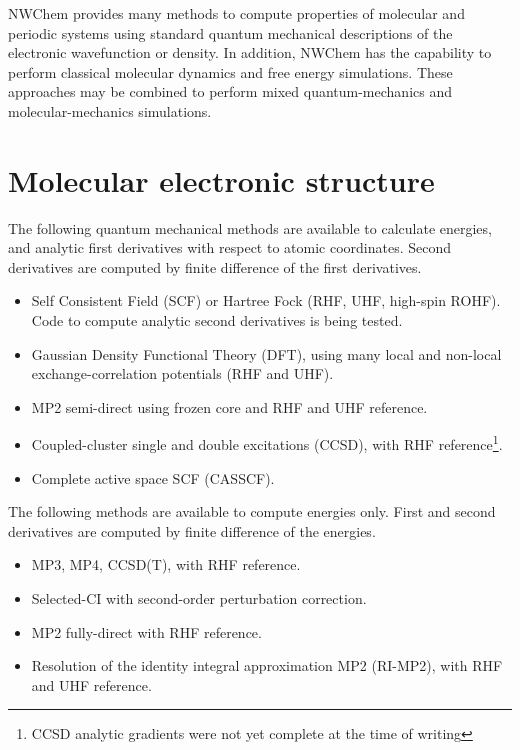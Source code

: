 \label{sec:functionality}

NWChem provides many methods to compute properties of molecular and
periodic systems using standard quantum mechanical descriptions of the
electronic wavefunction or density.  In addition, NWChem has the
capability to perform classical molecular dynamics and free energy
simulations.  These approaches may be combined to perform mixed
quantum-mechanics and molecular-mechanics simulations. 

\section{Molecular electronic structure}

The following quantum mechanical methods are available to calculate
energies, and analytic first derivatives with respect to atomic
coordinates.  Second derivatives are computed by finite difference of
the first derivatives.

\begin{itemize}
\item Self Consistent Field (SCF) or Hartree Fock (RHF, UHF, high-spin
  ROHF).  Code to compute analytic second derivatives is being tested.
\item Gaussian Density Functional Theory (DFT), using many local and
  non-local exchange-correlation potentials (RHF and UHF).
\item MP2 semi-direct using frozen core and RHF and UHF reference.

\item Coupled-cluster single and double excitations (CCSD), with RHF
  reference\footnote{CCSD analytic gradients were not yet complete at
    the time of writing}.

\item Complete active space SCF (CASSCF).

\end{itemize}

The following methods are available to compute energies only.  First
and second derivatives are computed by finite difference of the
energies.
\begin{itemize}
\item MP3, MP4, CCSD(T), with RHF reference.
\item Selected-CI with second-order perturbation correction.
\item MP2 fully-direct with RHF reference.
\item Resolution of the identity integral approximation MP2 (RI-MP2), with
  RHF and UHF reference.
\end{itemize}

